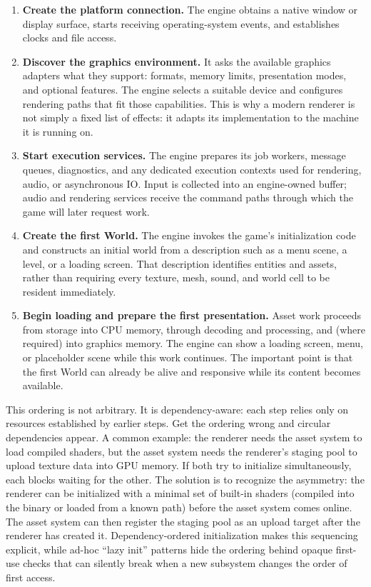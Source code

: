 \documentclass[
  11pt,
  letterpaper,
  DIV=11,
  numbers=noendperiod,
  twoside,
  open=right]{scrreprt}
\providecommand{\tightlist}{%
  \setlength{\itemsep}{0pt}\setlength{\parskip}{0pt}}
\begin{document}
\begin{enumerate}
\def\labelenumi{\arabic{enumi}.}
\tightlist
\item
  \textbf{Create the platform connection.} The engine obtains a native
  window or display surface, starts receiving operating-system events,
  and establishes clocks and file access.
\item
  \textbf{Discover the graphics environment.} It asks the available
  graphics adapters what they support: formats, memory limits,
  presentation modes, and optional features. The engine selects a
  suitable device and configures rendering paths that fit those
  capabilities. This is why a modern renderer is not simply a fixed list
  of effects: it adapts its implementation to the machine it is running
  on.
\item
  \textbf{Start execution services.} The engine prepares its job
  workers, message queues, diagnostics, and any dedicated execution
  contexts used for rendering, audio, or asynchronous IO. Input is
  collected into an engine-owned buffer; audio and rendering services
  receive the command paths through which the game will later request
  work.
\item
  \textbf{Create the first World.} The engine invokes the game's
  initialization code and constructs an initial world from a description
  such as a menu scene, a level, or a loading screen. That description
  identifies entities and assets, rather than requiring every texture,
  mesh, sound, and world cell to be resident immediately.
\item
  \textbf{Begin loading and prepare the first presentation.} Asset work
  proceeds from storage into CPU memory, through decoding and
  processing, and (where required) into graphics memory. The engine can
  show a loading screen, menu, or placeholder scene while this work
  continues. The important point is that the first World can already be
  alive and responsive while its content becomes available.
\end{enumerate}

This ordering is not arbitrary. It is dependency-aware: each step relies
only on resources established by earlier steps. Get the ordering wrong
and circular dependencies appear. A common example: the renderer needs
the asset system to load compiled shaders, but the asset system needs
the renderer's staging pool to upload texture data into GPU memory. If
both try to initialize simultaneously, each blocks waiting for the
other. The solution is to recognize the asymmetry: the renderer can be
initialized with a minimal set of built-in shaders (compiled into the
binary or loaded from a known path) before the asset system comes
online. The asset system can then register the staging pool as an upload
target after the renderer has created it. Dependency-ordered
initialization makes this sequencing explicit, while ad-hoc ``lazy
init'' patterns hide the ordering behind opaque first-use checks that
can silently break when a new subsystem changes the order of first
access.
\end{document}

